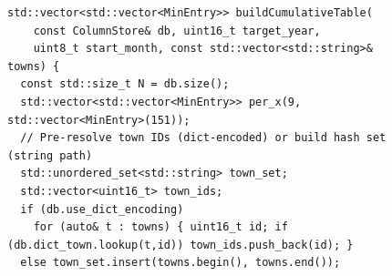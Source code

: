 \documentclass[11pt,a4paper]{article}
\begin{document}
\begin{figure}[H]

\begin{minipage}[t]{0.54\linewidth}
\begin{lstlisting}[name=cumulTable]
std::vector<std::vector<MinEntry>> buildCumulativeTable(
    const ColumnStore& db, uint16_t target_year,
    uint8_t start_month, const std::vector<std::string>& towns) {
  const std::size_t N = db.size();
  std::vector<std::vector<MinEntry>> per_x(9, std::vector<MinEntry>(151));
  // Pre-resolve town IDs (dict-encoded) or build hash set (string path)
  std::unordered_set<std::string> town_set;
  std::vector<uint16_t> town_ids;
  if (db.use_dict_encoding)
    for (auto& t : towns) { uint16_t id; if (db.dict_town.lookup(t,id)) town_ids.push_back(id); }
  else town_set.insert(towns.begin(), towns.end());
 

\end{lstlisting}
\end{minipage}
\end{figure}
\end{document}
